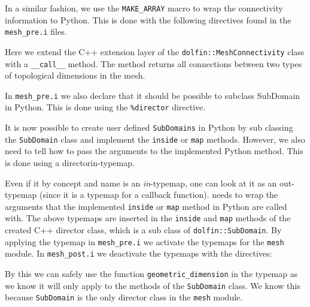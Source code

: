 In a similar fashion, we use the \texttt{MAKE\_}\texttt{ARRAY} macro to wrap the connectivity information to Python. This is done with the following \swig directives found in the \texttt{mesh\_pre.i} files.
Here we extend the C++ extension layer of the \texttt{dolfin::}\texttt{MeshConnectivity} class with a \texttt{\_\_call\_\_} method. The method returns all connections between two types of topological dimensions in the mesh.\par

In \texttt{mesh\_pre.i} we also declare that it should be possible to subclass SubDomain in Python. This is done using the \texttt{\%director} directive.
\begin{c++}
\end{c++}
It is now possible to create user defined \texttt{SubDomains} in Python by sub classing the \texttt{SubDomain} class and implement the \texttt{inside} or \texttt{map} methods. However, we also need to tell \swig how to pass the arguments to the implemented Python method. This is done using a directorin-typemap.
Even if it by concept and name is an \textit{in}-typemap, one can look at it as an out-typemap
(since it is a typemap for a callback function). \swig needs to wrap the arguments that the implemented \texttt{inside} or \texttt{map} method in Python are called with. The above typemaps are inserted in the \texttt{inside} and \texttt{map} methods of the \swig created C++ director class, which is a sub class of \texttt{dolfin::SubDomain}. By applying the typemap in \texttt{mesh\_pre.i} we activate the typemaps for the \texttt{mesh} module. In \texttt{mesh\_post.i} we deactivate the typemaps with the directives:
\begin{c++}
\end{c++}
By this we can safely use the function \texttt{geometric\_dimension} in the typemap as we know it will only apply to the methods of the \texttt{SubDomain} class. We know this because \texttt{SubDomain} is the only director class in the \texttt{mesh} module.\par

